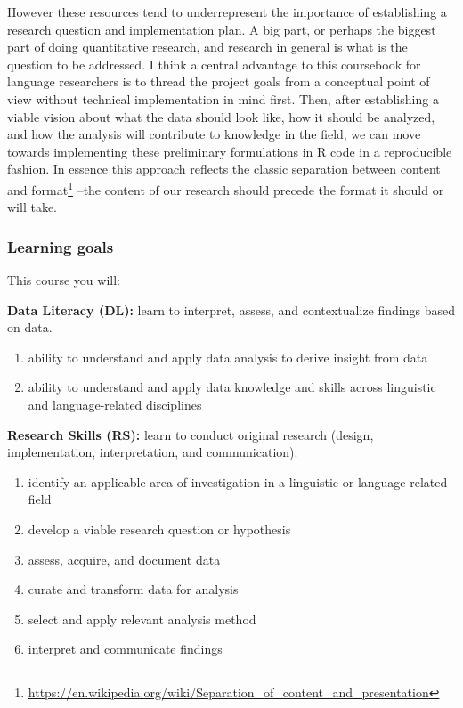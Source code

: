 \documentclass[
]{article}
\DeclareRobustCommand{\href}[2]{#2\footnote{\url{#1}}}
\providecommand{\tightlist}{%
  \setlength{\itemsep}{0pt}\setlength{\parskip}{0pt}}
\begin{document}
However these resources tend to underrepresent the importance of establishing a research question and implementation plan. A big part, or perhaps the biggest part of doing quantitative research, and research in general is what is the question to be addressed. I think a central advantage to this coursebook for language researchers is to thread the project goals from a conceptual point of view without technical implementation in mind first. Then, after establishing a viable vision about what the data should look like, how it should be analyzed, and how the analysis will contribute to knowledge in the field, we can move towards implementing these preliminary formulations in R code in a reproducible fashion. In essence this approach reflects \href{https://en.wikipedia.org/wiki/Separation_of_content_and_presentation}{the classic separation between content and format} --the content of our research should precede the format it should or will take.

\hypertarget{learning-goals}{%
\subsubsection*{Learning goals}\label{learning-goals}}

This course you will:

\textbf{Data Literacy (DL):} learn to interpret, assess, and contextualize findings based on data.

\begin{enumerate}
\def\labelenumi{\arabic{enumi}.}
\tightlist
\item
  ability to understand and apply data analysis to derive insight from data
\item
  ability to understand and apply data knowledge and skills across linguistic and language-related disciplines
\end{enumerate}

\textbf{Research Skills (RS):} learn to conduct original research (design, implementation, interpretation, and communication).

\begin{enumerate}
\def\labelenumi{\arabic{enumi}.}
\tightlist
\item
  identify an applicable area of investigation in a linguistic or language-related field
\item
  develop a viable research question or hypothesis
\item
  assess, acquire, and document data
\item
  curate and transform data for analysis
\item
  select and apply relevant analysis method
\item
  interpret and communicate findings
\end{enumerate}
\end{document}
